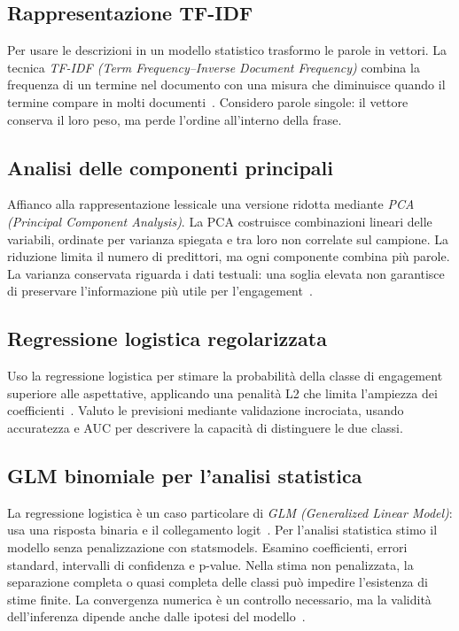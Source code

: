 \subsection{Rappresentazione TF-IDF}
\label{subsec:background-tfidf}

Per usare le descrizioni in un modello statistico trasformo le parole in vettori. La tecnica \emph{TF-IDF (Term Frequency--Inverse Document Frequency)} combina la frequenza di un termine nel documento con una misura che diminuisce quando il termine compare in molti documenti~\cite{SALTON1988513}. Considero parole singole: il vettore conserva il loro peso, ma perde l'ordine all'interno della frase.

\subsection{Analisi delle componenti principali}
\label{subsec:background-pca}

Affianco alla rappresentazione lessicale una versione ridotta mediante \emph{PCA (Principal Component Analysis)}. La PCA costruisce combinazioni lineari delle variabili, ordinate per varianza spiegata e tra loro non correlate sul campione. La riduzione limita il numero di predittori, ma ogni componente combina più parole. La varianza conservata riguarda i dati testuali: una soglia elevata non garantisce di preservare l'informazione più utile per l'engagement~\cite{jolliffe2016principal}.

\subsection{Regressione logistica regolarizzata}
\label{subsec:background-logistica}

Uso la regressione logistica per stimare la probabilità della classe di engagement superiore alle aspettative, applicando una penalità L2 che limita l'ampiezza dei coefficienti~\cite{josef_perktold_2024_10984387}. Valuto le previsioni mediante validazione incrociata, usando accuratezza e AUC per descrivere la capacità di distinguere le due classi.

\subsection{GLM binomiale per l'analisi statistica}
\label{subsec:background-glm}

La regressione logistica è un caso particolare di \emph{GLM (Generalized Linear Model)}: usa una risposta binaria e il collegamento logit~\cite{68aee965-a8a0-3e72-9f89-8d89ae91a62b}. Per l'analisi statistica stimo il modello senza penalizzazione con statsmodels. Esamino coefficienti, errori standard, intervalli di confidenza e p-value. Nella stima non penalizzata, la separazione completa o quasi completa delle classi può impedire l'esistenza di stime finite. La convergenza numerica è un controllo necessario, ma la validità dell'inferenza dipende anche dalle ipotesi del modello~\cite{10.1093/biomet/71.1.1}.

